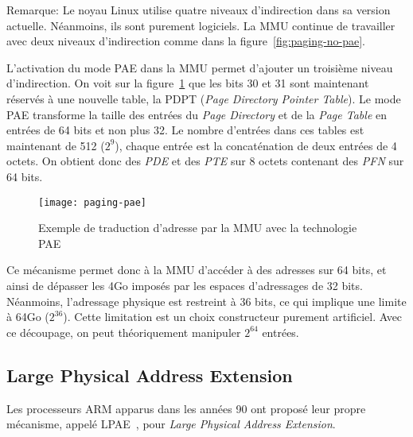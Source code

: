       \begin{paragraph}{Remarque:}
        Le noyau Linux utilise quatre niveaux d'indirection dans sa version
        actuelle. Néanmoins, ils sont purement logiciels. La MMU continue de
        travailler avec deux niveaux d'indirection comme dans la
        figure~\ref{fig:paging-no-pae}.\\
      \end{paragraph}
      
      L'activation du mode PAE dans la MMU permet d'ajouter un troisième niveau
      d'indirection. On voit sur la figure~\ref{fig:paging-pae} que les bits 30
      et 31 sont maintenant réservés à une nouvelle table, la
      PDPT (\textit{Page
        Directory Pointer Table}). Le mode PAE transforme la taille des entrées
      du \textit{Page Directory} et de la \textit{Page Table} en entrées de 64
      bits et non plus 32. Le nombre d'entrées dans ces tables est maintenant de
      512 ($2^{9}$), chaque entrée est la concaténation de deux entrées de 4
      octets. On obtient donc des \textit{PDE} et des \textit{PTE} sur 8 octets
      contenant des \textit{PFN} sur 64 bits.

      \begin{figure}[ht]
        \centering \texttt{[image: paging-pae]}
        \caption{Exemple de traduction d'adresse par la MMU avec la technologie
          PAE}
        \label{fig:paging-pae}
      \end{figure}
      
      Ce mécanisme permet donc à la MMU d'accéder à des adresses sur 64 bits, et
      ainsi de dépasser les 4Go imposés par les espaces d'adressages de 32
      bits. Néanmoins, l'adressage physique est restreint à 36 bits, ce qui
      implique une limite à 64Go ($2^{36}$). Cette limitation est un choix
      constructeur purement artificiel. Avec ce découpage, on peut théoriquement
      manipuler $2^{64}$ entrées.


    \subsection{Large Physical Address Extension}

      Les processeurs ARM apparus dans les années 90 ont proposé leur propre
      mécanisme, appelé
      LPAE~\citep{arm2012principles,marinas2011linux}, pour \textit{Large Physical Address
        Extension}.

